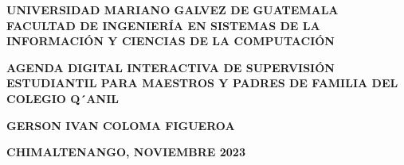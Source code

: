 \begin{titlepage}
	\begin{center}
		{\Large \textbf{UNIVERSIDAD MARIANO GALVEZ DE GUATEMALA}}
		{\Large \textbf{FACULTAD DE INGENIERÍA EN SISTEMAS DE LA INFORMACIÓN Y CIENCIAS DE LA COMPUTACIÓN}}
		
		{\vspace{95mm}\Large \textbf{AGENDA DIGITAL INTERACTIVA DE SUPERVISIÓN ESTUDIANTIL PARA MAESTROS Y PADRES DE FAMILIA DEL COLEGIO Q´ANIL}}
		
		{\vspace{110mm}\Large \textbf{GERSON IVAN COLOMA FIGUEROA}}
		
		{\Large \textbf{CHIMALTENANGO, NOVIEMBRE 2023}}
		
		
	\end{center}
\end{titlepage}